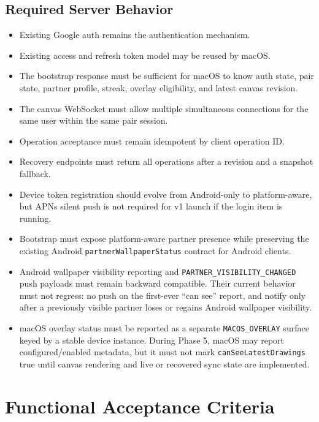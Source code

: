 \documentclass[11pt]{article}
\begin{document}
\subsection{Required Server Behavior}

\begin{itemize}
  \item Existing Google auth remains the authentication mechanism.
  \item Existing access and refresh token model may be reused by macOS.
  \item The bootstrap response must be sufficient for macOS to know auth state, pair state, partner profile, streak, overlay eligibility, and latest canvas revision.
  \item The canvas WebSocket must allow multiple simultaneous connections for the same user within the same pair session.
  \item Operation acceptance must remain idempotent by client operation ID.
  \item Recovery endpoints must return all operations after a revision and a snapshot fallback.
  \item Device token registration should evolve from Android-only to platform-aware, but APNs silent push is not required for v1 launch if the login item is running.
  \item Bootstrap must expose platform-aware partner presence while preserving the existing Android \texttt{partnerWallpaperStatus} contract for Android clients.
  \item Android wallpaper visibility reporting and \texttt{PARTNER\_VISIBILITY\_CHANGED} push payloads must remain backward compatible. Their current behavior must not regress: no push on the first-ever ``can see'' report, and notify only after a previously visible partner loses or regains Android wallpaper visibility.
  \item macOS overlay status must be reported as a separate \texttt{MACOS\_OVERLAY} surface keyed by a stable device instance. During Phase 5, macOS may report configured/enabled metadata, but it must not mark \texttt{canSeeLatestDrawings} true until canvas rendering and live or recovered sync state are implemented.
\end{itemize}

\section{Functional Acceptance Criteria}
\end{document}
